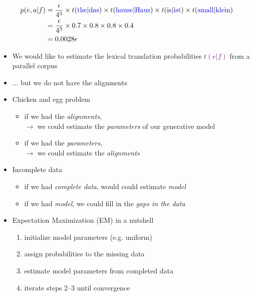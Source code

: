 \documentclass[landscape]{slides}
\newcommand{\example}[1]{\textcolor{darkblue}{\rm #1}}
\newcommand{\maths}[1]{\textcolor{purple}{#1}}
\begin{document}
\maths{\begin{equation*}
\begin{split}
p(e,a|f) &= \frac{\epsilon}{4^3} 
\times t(\mbox{\example{the}}|\mbox{\example{das}}) 
\times t(\mbox{\example{house}}|\mbox{\example{Haus}}) 
\times t(\mbox{i\example{s}}|\mbox{\example{ist}}) 
\times t(\mbox{\example{small}}|\mbox{\example{klein}}) 
\\
&= \frac{\epsilon}{4^3} 
\times 0.7 \times 0.8 \times 0.8 \times 0.4 \\
&= 0.0028 \epsilon\\
\end{split}
\end{equation*}}


\vspace{10mm}
\begin{itemize}
\item We would like to estimate the lexical translation probabilities \maths{$t(e|f)$} from a parallel corpus
\item ... but we do not have the alignments
\item Chicken and egg problem
\begin{itemize}
\item if we had the {\em alignments},\\ $\rightarrow$ we could estimate the {\em parameters} of our generative model\\[-3mm]
\item if we had the {\em parameters},\\ $\rightarrow$ we could estimate the {\em alignments}
\end{itemize}
\end{itemize}


\vspace{20mm}
\begin{itemize}
\item Incomplete data
\begin{itemize}
\item if we had {\em complete data}, would could estimate {\em model}
\item if we had {\em model}, we could fill in the {\em gaps in the data}
\end{itemize}
\item Expectation Maximization (EM) in a nutshell
\begin{enumerate}
\item initialize model parameters (e.g. uniform)
\item assign probabilities to the missing data
\item estimate model parameters from completed data
\item iterate steps 2--3 until convergence 
\end{enumerate}
\end{itemize}
\end{document}
